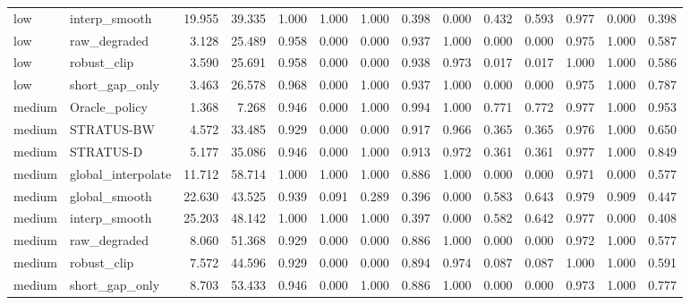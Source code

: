 \begin{tabular}{llrrrrrrrrrrrr}
low & interp_smooth & 19.955 & 39.335 & 1.000 & 1.000 & 1.000 & 0.398 & 0.000 & 0.432 & 0.593 & 0.977 & 0.000 & 0.398 \\
low & raw_degraded & 3.128 & 25.489 & 0.958 & 0.000 & 0.000 & 0.937 & 1.000 & 0.000 & 0.000 & 0.975 & 1.000 & 0.587 \\
low & robust_clip & 3.590 & 25.691 & 0.958 & 0.000 & 0.000 & 0.938 & 0.973 & 0.017 & 0.017 & 1.000 & 1.000 & 0.586 \\
low & short_gap_only & 3.463 & 26.578 & 0.968 & 0.000 & 1.000 & 0.937 & 1.000 & 0.000 & 0.000 & 0.975 & 1.000 & 0.787 \\
medium & Oracle_policy & 1.368 & 7.268 & 0.946 & 0.000 & 1.000 & 0.994 & 1.000 & 0.771 & 0.772 & 0.977 & 1.000 & 0.953 \\
medium & STRATUS-BW & 4.572 & 33.485 & 0.929 & 0.000 & 0.000 & 0.917 & 0.966 & 0.365 & 0.365 & 0.976 & 1.000 & 0.650 \\
medium & STRATUS-D & 5.177 & 35.086 & 0.946 & 0.000 & 1.000 & 0.913 & 0.972 & 0.361 & 0.361 & 0.977 & 1.000 & 0.849 \\
medium & global_interpolate & 11.712 & 58.714 & 1.000 & 1.000 & 1.000 & 0.886 & 1.000 & 0.000 & 0.000 & 0.971 & 0.000 & 0.577 \\
medium & global_smooth & 22.630 & 43.525 & 0.939 & 0.091 & 0.289 & 0.396 & 0.000 & 0.583 & 0.643 & 0.979 & 0.909 & 0.447 \\
medium & interp_smooth & 25.203 & 48.142 & 1.000 & 1.000 & 1.000 & 0.397 & 0.000 & 0.582 & 0.642 & 0.977 & 0.000 & 0.408 \\
medium & raw_degraded & 8.060 & 51.368 & 0.929 & 0.000 & 0.000 & 0.886 & 1.000 & 0.000 & 0.000 & 0.972 & 1.000 & 0.577 \\
medium & robust_clip & 7.572 & 44.596 & 0.929 & 0.000 & 0.000 & 0.894 & 0.974 & 0.087 & 0.087 & 1.000 & 1.000 & 0.591 \\
medium & short_gap_only & 8.703 & 53.433 & 0.946 & 0.000 & 1.000 & 0.886 & 1.000 & 0.000 & 0.000 & 0.973 & 1.000 & 0.777 \\
\bottomrule
\end{tabular}
